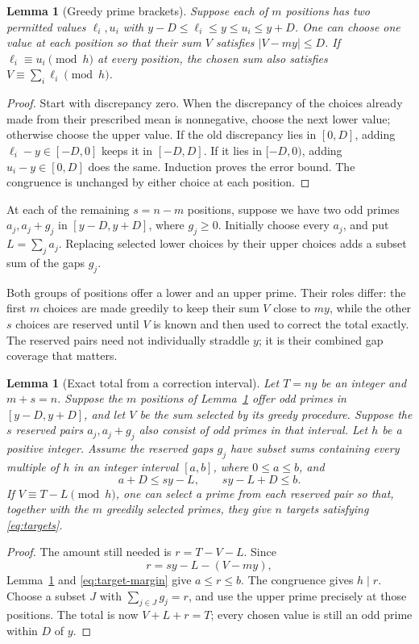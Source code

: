 \documentclass[11pt]{article}
\newtheorem{lemma}[theorem]{Lemma}
\theoremstyle{definition}
\begin{document}
\begin{lemma}[Greedy prime brackets]\label{lem:brackets}
Suppose each of \(m\) positions has two permitted values \(\ell_i,u_i\) with
\(y-D\le\ell_i\le y\le u_i\le y+D\). One can choose one value at each position
so that their sum \(V\) satisfies \(|V-my|\le D\).
If \(\ell_i\equiv u_i\pmod h\) at every position, the chosen sum also satisfies
\(V\equiv\sum_i\ell_i\pmod h\).
\end{lemma}
\begin{proof}
Start with discrepancy zero. When the discrepancy of the choices already made
from their prescribed mean is nonnegative, choose the next lower value;
otherwise choose the upper value. If the old discrepancy lies in \([0,D]\),
adding \(\ell_i-y\in[-D,0]\) keeps it in \([-D,D]\). If it lies in \([-D,0)\),
adding \(u_i-y\in[0,D]\) does the same. Induction proves the error bound. The
congruence is unchanged by either choice at each position.
\end{proof}

At each of the remaining \(s=n-m\) positions, suppose we have two odd primes
\(a_j,a_j+g_j\) in \([y-D,y+D]\), where \(g_j\ge0\). Initially choose every
\(a_j\), and put \(L=\sum_j a_j\). Replacing selected lower choices by their
upper choices adds a subset sum of the gaps \(g_j\).

Both groups of positions offer a lower and an upper prime. Their roles differ:
the first \(m\) choices are made greedily to keep their sum \(V\) close to
\(my\), while the other \(s\) choices are reserved until \(V\) is known and
then used to correct the total exactly. The reserved pairs need not individually
straddle \(y\); it is their combined gap coverage that matters.

\begin{lemma}[Exact total from a correction interval]\label{lem:exact-targets}
Let \(T=ny\) be an integer and \(m+s=n\). Suppose the \(m\) positions of
Lemma~\ref{lem:brackets} offer odd primes in \([y-D,y+D]\), and let \(V\) be
the sum selected by its greedy procedure. Suppose the \(s\) reserved pairs
\(a_j,a_j+g_j\) also consist of odd primes in that interval. Let \(h\) be a
positive integer. Assume the reserved gaps \(g_j\) have subset sums containing every
multiple of \(h\) in an integer interval \([a,b]\), where \(0\le a\le b\), and
\begin{equation}\label{eq:target-margin}
 a+D\le sy-L,\qquad sy-L+D\le b.
\end{equation}
If \(V\equiv T-L\pmod h\), one can select a prime from each reserved pair so
that, together with the \(m\) greedily selected primes, they give \(n\) targets
satisfying \eqref{eq:targets}.
\end{lemma}
\begin{proof}
The amount still needed is \(r=T-V-L\). Since
\[
 r=sy-L-(V-my),
\]
Lemma~\ref{lem:brackets} and \eqref{eq:target-margin} give \(a\le r\le b\).
The congruence gives \(h\mid r\). Choose a subset \(J\) with
\(\sum_{j\in J}g_j=r\), and use the upper prime precisely at those positions.
The total is now \(V+L+r=T\); every chosen value is still an odd prime within
\(D\) of \(y\).
\end{proof}
\end{document}
